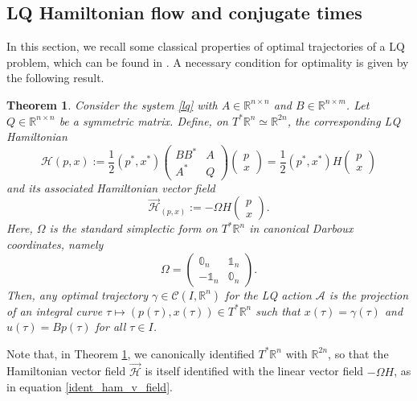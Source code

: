 \documentclass[reqno]{amsart}
\theoremstyle{plain}
\newtheorem{thm}{Theorem}[section]
\theoremstyle{definition}
\theoremstyle{remark}
\newcommand{\R}{\mathbb{R}}
\begin{document}
\subsection{LQ Hamiltonian flow and conjugate times}
In this section, we recall some classical properties of optimal trajectories of a LQ problem, which can be found in \cite[Chapter 16]{agrachev2013control}. A necessary condition for optimality is given by the following result.
\begin{thm}\label{ham_LQ}
 Consider the system \eqref{lq} with  $A\in \mathbb{R}^{n \times n}$ and $B\in\mathbb{R}^{n \times m}$. Let $Q\in\mathbb{R}^{n\times n}$ be a symmetric matrix. Define, on $T^*\mathbb{R}^n\simeq \R^{2n}$, the corresponding LQ Hamiltonian 
	\begin{equation}\label{explicit_LQ_hamiltonian}
		\mathcal{H}(p,x) := \frac{1}{2}(p^*,x^*)\begin{pmatrix}
			BB^* & A\\
			A^* & Q
		\end{pmatrix}\begin{pmatrix}
			p\\
			x
		\end{pmatrix} = \frac{1}{2}(p^*,x^*)H\begin{pmatrix}
			p\\
			x
		\end{pmatrix}
	\end{equation}
	and its associated Hamiltonian vector field
	\begin{equation}\label{ident_ham_v_field}
	\overrightarrow{\mathcal{H}}_{(p,x)}:=-\Omega H\begin{pmatrix}
		p\\
		x
	\end{pmatrix}.
	\end{equation}
	Here, $\Omega$ is the standard simplectic form on $T^*\mathbb{R}^n$ in canonical Darboux coordinates, namely
\begin{equation}	
\Omega=\begin{pmatrix}
		\mathbb{0}_n & \mathbb{1}_n\\
		-\mathbb{1}_n & \mathbb{0}_n
	\end{pmatrix}.
\end{equation}
Then, any optimal trajectory $\gamma \in \mathcal{C}(I,\R^n)$ for the LQ action $\mathcal{A}$ is the projection of an integral curve $\tau\mapsto (p(\tau),x(\tau))\in T^*\R^n$ such that $x(\tau)=\gamma(\tau)$ and $u(\tau)=Bp(\tau)$ for all $\tau \in I$.
\end{thm}
Note that, in Theorem \ref{ham_LQ}, we canonically identified $T^*\mathbb{R}^n$ with $\mathbb{R}^{2n}$, so that the Hamiltonian vector field $\overrightarrow{\mathcal{H}}$ is itself identified with the linear vector field $-\Omega H$, as in equation \eqref{ident_ham_v_field}. 
\end{document}
